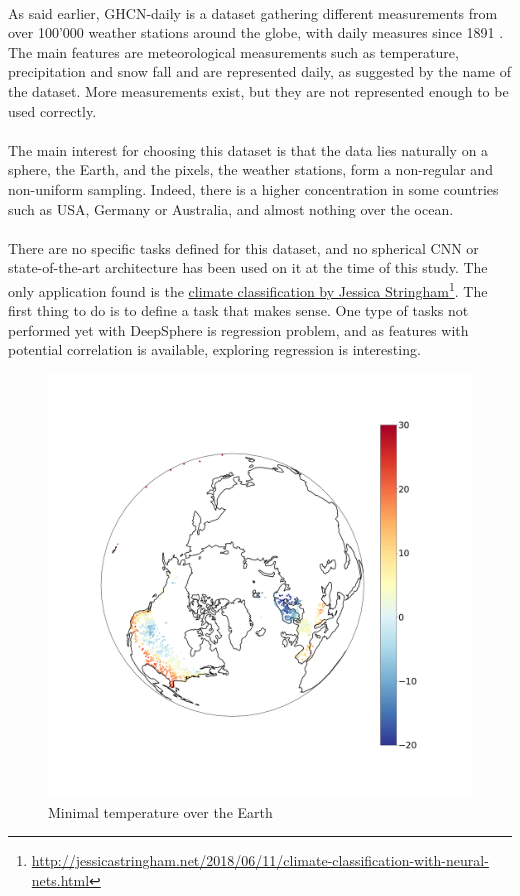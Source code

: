 \documentclass[11pt]{report}
\begin{document}
\paragraph*{}
As said earlier, GHCN-daily is a dataset gathering different measurements from over 100'000 weather stations around the globe, with daily measures since 1891 \cite{noauthor_global_nodate}. The main features are meteorological measurements such as temperature, precipitation and snow fall and are represented daily, as suggested by the name of the dataset. More measurements exist, but they are not represented enough to be used correctly.

\paragraph*{}
The main interest for choosing this dataset is that the data lies naturally on a sphere, the Earth, and the pixels, the weather stations, form a non-regular and non-uniform sampling. Indeed, there is a higher concentration in some countries such as USA, Germany or Australia, and almost nothing over the ocean.

\paragraph*{}
There are no specific tasks defined for this dataset, and no spherical CNN or state-of-the-art architecture has been used on it at the time of this study.
The only application found is the  \href{http://jessicastringham.net/2018/06/11/climate-classification-with-neural-nets.html}{climate classification by Jessica Stringham}\footnote{\url{http://jessicastringham.net/2018/06/11/climate-classification-with-neural-nets.html}}.
The first thing to do is to define a task that makes sense. One type of tasks not performed yet with DeepSphere is regression problem, and as features with potential correlation is available, exploring regression is interesting.

\begin{figure}[!ht]
    \centering
    \includegraphics[width=0.6\linewidth]{temp_min.png}
    \caption{Minimal temperature over the Earth}
    \label{fig:temp_min}
\end{figure}
\clearpage
\end{document}

